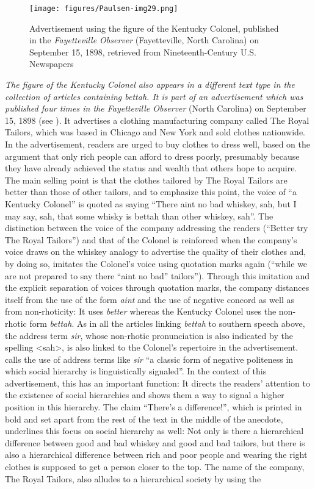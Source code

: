 \begin{figure}[b]
\texttt{[image: figures/Paulsen-img29.png]}
\caption{
Advertisement using the figure of the Kentucky Colonel, published in the \emph{Fayetteville Observer} (Fayetteville, North Carolina) on September 15, 1898, retrieved from Nineteenth-Century U.S. Newspapers
}
\label{fig:key:29}
\end{figure}

\emph{\textup{The figure of the Kentucky Colonel also appears in a different text type in the collection of articles containing} bettah\textup{. It is part of an advertisement which was published four times in the} Fayetteville Observer} (North Carolina) on September 15, 1898 (see ). It advertises a clothing manufacturing company called The Royal Tailors, which was based in Chicago and New York and sold clothes nationwide. In the advertisement, readers are urged to buy clothes to dress well, based on the argument that only rich people can afford to dress poorly, presumably because they have already achieved the status and wealth that others hope to acquire. The main selling point is that the clothes tailored by The Royal Tailors are better than those of other tailors, and to emphasize this point, the voice of “a Kentucky Colonel” is quoted as saying “There aint no bad whiskey, sah, but I may say, sah, that some whisky is bettah than other whiskey, sah”. The distinction between the voice of the company addressing the readers (“Better try The Royal Tailors”) and that of the Colonel is reinforced when the company’s voice draws on the whiskey analogy to advertise the quality of their clothes and, by doing so, imitates the Colonel’s voice using quotation marks again (“while we are not prepared to say there “aint no bad” tailors”). Through this imitation and the explicit separation of voices through quotation marks, the company distances itself from the use of the form \emph{aint} and the use of negative concord as well as from non-rhoticity: It uses \emph{better} whereas the Kentucky Colonel uses the non-rhotic form \emph{bettah}. As in all the articles linking \emph{bettah} to southern speech above, the address term \emph{sir}, whose non-rhotic pronunciation is also indicated by the spelling <sah>, is also linked to the Colonel’s repertoire in the advertisement. \citet[175]{Davies2007} calls the use of address terms like \emph{sir} “a classic form of negative politeness in which social hierarchy is linguistically signaled”. In the context of this advertisement, this has an important function: It directs the readers’ attention to the existence of social hierarchies and shows them a way to signal a higher position in this hierarchy. The claim “There’s a difference!”, which is printed in bold and set apart from the rest of the text in the middle of the anecdote, underlines this focus on social hierarchy as well: Not only is there a hierarchical difference between good and bad whiskey and good and bad tailors, but there is also a hierarchical difference between rich and poor people and wearing the right clothes is supposed to get a person closer to the top. The name of the company, The Royal Tailors, also alludes to a hierarchical society by using the 